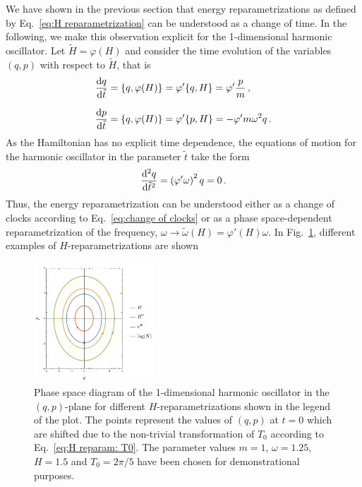 \documentclass[onecolumn,notitlepage,superscriptaddress, nofootinbib,nobibnotes, aps,prd,10pt]{revtex4-1}%
\begin{document}
We have shown in the previous section that energy reparametrizations as defined by Eq.~\eqref{eq:H reparametrization} can be understood as a change of time. In the following, we make this observation explicit for the 1-dimensional harmonic oscillator. Let $\tilde{H} = \varphi(H)$ and consider the time evolution of the variables $(q,p)$ with respect to $\tilde{H}$, that is
%
\begin{subequations}
\begin{align}
    \dv{q}{\tilde{t}} &= \{q,\varphi(H)\} = \varphi'\{q,H\} = \varphi'\frac{p}{m}\, ,\\[7pt] 
    \dv{p}{\tilde{t}} &= \{q,\varphi(H)\} = \varphi'\{p,H\} = -\varphi'm\omega^2 q\, .
\end{align}
\end{subequations}
%
As the Hamiltonian has no explicit time dependence, the equations of motion for the harmonic oscillator in the parameter $\tilde{t}$ take the form
%
\begin{equation}
\dv[2]{q}{\tilde{t}} = \left(\varphi'\omega\right)^2q = 0\, .
\end{equation}
%
Thus, the energy reparametrization can be understood either as a change of clocks according to Eq.~\eqref{eq:change of clocks} or as a phase space-dependent reparametrization of the frequency, $\omega\rightarrow \tilde{\omega}(H) = \varphi'(H)\omega$. In Fig.~\ref{fig:H reparam}, different examples of $H$-reparametrizations are shown

\begin{figure}
    \centering
    \includegraphics[width=0.4\textwidth]{Hreparam.pdf}
    \caption{Phase space diagram of the 1-dimensional harmonic oscillator in the $(q,p)$-plane for different $H$-reparametrizations shown in the legend of the plot. The points represent the values of $(q,p)$ at $t = 0$ which are shifted due to the non-trivial transformation of $T_0$ according to Eq.~\eqref{eq:H reparam: T0}.  The parameter values $m=1$, $\omega = 1.25$, $H = 1.5$ and $T_0 = 2\pi/5$ have been chosen for demonstrational purposes.}
    \label{fig:H reparam}
\end{figure}
\end{document}
